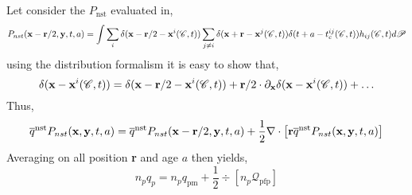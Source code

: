 Let consider the $P_\text{nst}$ evaluated in,
\begin{equation}
  P_{nst}(\textbf{x}-\textbf{r}/2,\textbf{y},t,a)= 
  \int \sum_{i}\delta(\textbf{x}-\textbf{r}/2-\textbf{x}^i(\mathscr{C},t))
  \sum_{j\neq i}\delta(\textbf{x}+\textbf{r}-\textbf{x}^j(\mathscr{C},t)) 
  \delta(t+a-t_c^{ij}(\mathscr{C},t)) 
  h_{ij}(\mathscr{C},t) d\mathscr{P} 
\end{equation}
using the distribution formalism it is easy to show that, 
\begin{equation}
  \delta(\textbf{x}-\textbf{x}^i(\mathscr{C},t))
  = 
  \delta(\textbf{x}-\textbf{r}/2-\textbf{x}^i(\mathscr{C},t))
  +\textbf{r}/2\cdot \partial_\textbf{x}
  \delta(\textbf{x}-\textbf{x}^i(\mathscr{C},t))
  + \ldots
\end{equation}
Thus, 
\begin{equation}
  \overline{q}^\text{nst}P_{nst}(\textbf{x},\textbf{y},t,a)
  = \overline{q}^\text{nst}P_{nst}(\textbf{x} - \textbf{r}/2,\textbf{y},t,a)
  + \frac{1}{2}
  \mathbf{\nabla}\cdot\left[
    \textbf{r} \overline{q}^\text{nst}P_{nst}(\textbf{x},\textbf{y},t,a)
  \right]
\end{equation}
Averaging on all position \textbf{r} and age $a$ then yields, 
\begin{equation}
  n_p q_p 
  = n_p q_\text{pm}
  + \frac{1}{2}
  \div\left[
    n_p \mathcal{Q}_\text{pfp}
  \right]
\end{equation}

